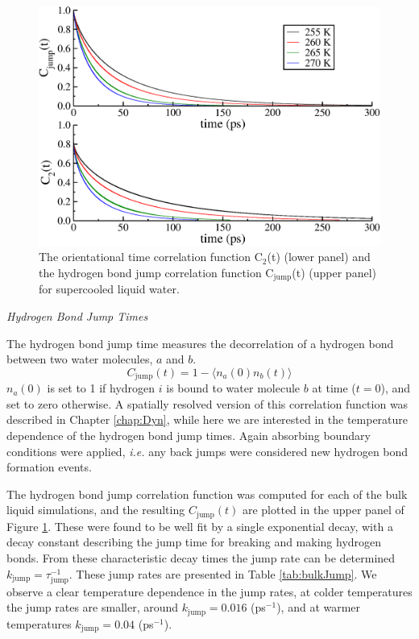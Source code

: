 \begin{figure}
\includegraphics[width=\linewidth]{Figures/jump_lcorr}
\caption{\label{fig:jump_lcorr} The orientational time correlation
  function C$_2$(t) (lower panel) and the hydrogen bond jump
  correlation function C$_\mathrm{jump}$(t) (upper panel) for
  supercooled liquid water. }
\end{figure}                


\begin{flushleft}
\textit{Hydrogen Bond Jump Times}
\end{flushleft}
The hydrogen bond jump time measures the decorrelation of a hydrogen
bond between two water molecules, $a$ and $b$. 
\begin{equation}\label{jump}
C_\mathrm{jump}(t) = 1 - \langle n_a(0) n_b(t) \rangle
\end{equation}
$n_a(0)$ is set to 1 if hydrogen $i$ is bound to water molecule $b$ at
time ($t=0$), and set to zero otherwise. A spatially resolved version
of this correlation function was described in Chapter \ref{chap:Dyn},
while here we are interested in the temperature dependence of the
hydrogen bond jump times. Again absorbing boundary conditions were
applied, \textit{i.e.} any back jumps were considered new hydrogen
bond formation events.

The hydrogen bond jump correlation function was computed for each of
the bulk liquid simulations, and the resulting $C_\mathrm{jump}(t)$
are plotted in the upper panel of Figure \ref{fig:jump_lcorr}. These
were found to be well fit by a single exponential decay, with a decay
constant describing the jump time for breaking and making hydrogen
bonds. From these characteristic decay times the jump rate can be
determined $k_\mathrm{jump} = \tau_\mathrm{jump}^{-1}$. These jump
rates are presented in Table \ref{tab:bulkJump}. We observe a clear
temperature dependence in the jump rates, at colder temperatures the
jump rates are smaller, around $k_\mathrm{jump} = 0.016$ (ps$^{-1}$),
and at warmer temperatures $k_\mathrm{jump} = 0.04$ (ps$^{-1}$).

